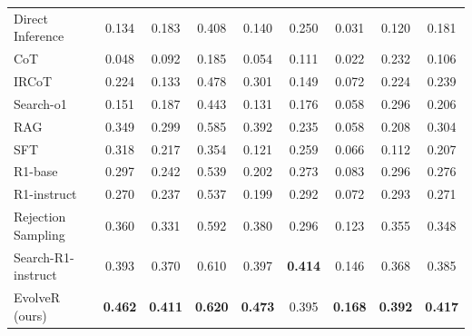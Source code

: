 \begin{table}[!t]
\begin{tabular}{l cc ccccc c}
        Direct Inference & 0.134 & 0.183 & 0.408 & 0.140 & 0.250 & 0.031 & 0.120 & 0.181 \\
        CoT & 0.048 & 0.092 & 0.185 & 0.054 & 0.111 & 0.022 & 0.232 & 0.106 \\
        IRCoT & 0.224 & 0.133 & 0.478 & 0.301 & 0.149 & 0.072 & 0.224 & 0.239 \\
        Search-o1 & 0.151 & 0.187 & 0.443 & 0.131 & 0.176 & 0.058 & 0.296 & 0.206 \\
        RAG & 0.349 & 0.299 & 0.585 & 0.392 & 0.235 & 0.058 & 0.208 & 0.304 \\
        SFT & 0.318 & 0.217 & 0.354 & 0.121 & 0.259 & 0.066 & 0.112 & 0.207 \\
        R1-base & 0.297 & 0.242 & 0.539 & 0.202 & 0.273 & 0.083 & 0.296 & 0.276 \\
        R1-instruct & 0.270 & 0.237 & 0.537 & 0.199 & 0.292 & 0.072 & 0.293 & 0.271 \\
        Rejection Sampling & 0.360 & 0.331 & 0.592 & 0.380 & 0.296 & 0.123 & 0.355 & 0.348 \\
        Search-R1-instruct & 0.393 & 0.370 & 0.610 & 0.397 & \textbf{0.414} & 0.146 & 0.368 & 0.385 \\
        \rowcolor{Gray}
        EvolveR (ours) & \textbf{0.462} & \textbf{0.411} & \textbf{0.620} & \textbf{0.473} & 0.395 & \textbf{0.168} & \textbf{0.392} & \textbf{0.417} \\
        \bottomrule
    \end{tabular}
\end{table}

